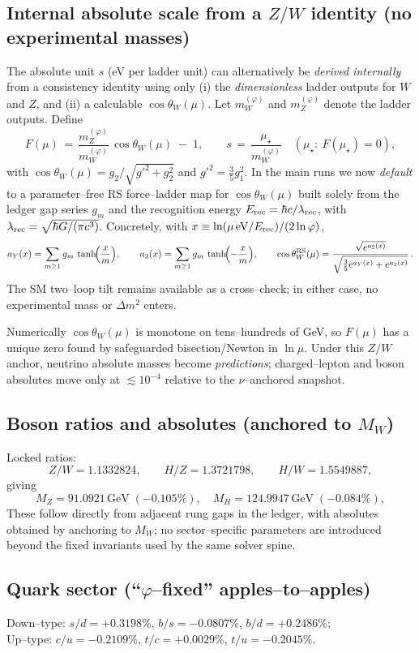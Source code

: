 \documentclass[11pt]{article}
\begin{document}
\subsection{Internal absolute scale from a $Z/W$ identity (no experimental masses)}
\label{subsec:ZW-anchor}
The absolute unit $s$ (eV per ladder unit) can alternatively be \emph{derived internally} from a consistency identity using only (i) the \emph{dimensionless} ladder outputs for $W$ and $Z$, and (ii) a calculable $\cos\theta_W(\mu)$.
Let $m_W^{(\varphi)}$ and $m_Z^{(\varphi)}$ denote the ladder outputs. Define
\[
  F(\mu) \,=\, \frac{m_Z^{(\varphi)}}{m_W^{(\varphi)}}\,\cos\theta_W(\mu)\; -\; 1,\qquad
  s \,=\, \frac{\mu_\star}{m_W^{(\varphi)}}\quad(\mu_\star:\ F(\mu_\star)=0),
\]
with $\cos\theta_W(\mu)=g_2/\sqrt{g'^2+g_2^2}$ and $g'^2=\tfrac{3}{5}g_1^2$.
In the main runs we now \emph{default} to a parameter--free RS force--ladder map for $\cos\theta_W(\mu)$ built solely from the ledger gap series $g_m$ and the recognition energy $E_{\rm rec}=\hbar c/\lambda_{\rm rec}$, with $\lambda_{\rm rec}=\sqrt{\hbar G/(\pi c^3)}$. Concretely, with $x\equiv \ln(\mu\,\mathrm{eV}/E_{\rm rec})/(2\ln\varphi)$,
\[
  a_Y(x)=\sum_{m\ge1} g_m\,\tanh\!\Bigl(\frac{x}{m}\Bigr),\qquad
  a_2(x)=\sum_{m\ge1} g_m\,\tanh\!\Bigl(-\frac{x}{m}\Bigr),\qquad
  \cos\theta_W^{\rm RS}(\mu)=\frac{\sqrt{e^{a_2(x)}}}{\sqrt{\tfrac{3}{5}e^{a_Y(x)}+e^{a_2(x)}}}\,.
\]
The SM two--loop tilt remains available as a cross--check; in either case, no experimental mass or $\Delta m^2$ enters.

Numerically $\cos\theta_W(\mu)$ is monotone on tens–hundreds of GeV, so $F(\mu)$ has a unique zero found by safeguarded bisection/Newton in $\ln\mu$. Under this $Z/W$ anchor, neutrino absolute masses become \emph{predictions}; charged--lepton and boson absolutes move only at $\lesssim10^{-4}$ relative to the $\nu$--anchored snapshot.

\subsection{Boson ratios and absolutes (anchored to $M_W$)}
Locked ratios:
\[
Z/W=1.1332824,\qquad H/Z=1.3721798,\qquad H/W=1.5549887,
\]
giving
\[
M_Z=91.0921\,\text{GeV}\;(-0.105\%),\quad
M_H=124.9947\,\text{GeV}\;(-0.084\%),
\]
These follow directly from adjacent rung gaps in the ledger, with absolutes obtained by anchoring to $M_W$; no sector--specific parameters are introduced beyond the fixed invariants used by the same solver spine.

\subsection{Quark sector (``$\varphi$--fixed'' apples--to--apples)}
Down--type:
$s/d=+0.3198\%$, $b/s=-0.0807\%$, $b/d=+0.2486\%$;\\
Up--type:
$c/u=-0.2109\%$, $t/c=+0.0029\%$, $t/u=-0.2045\%$.
\medskip
\end{document}
